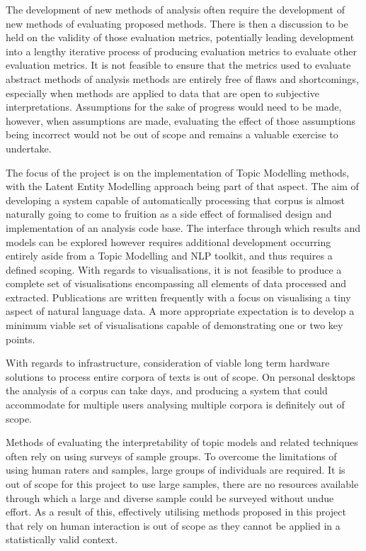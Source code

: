 \documentclass[10pt]{report}
\begin{document}
The development of new methods of analysis often require the development of new methods of evaluating proposed methods. There is then a discussion to be held on the validity of those evaluation metrics, potentially leading development into a lengthy iterative process of producing evaluation metrics to evaluate other evaluation metrics. It is not feasible to ensure that the metrics used to evaluate abstract methods of analysis methods are entirely free of flaws and shortcomings, especially when methods are applied to data that are open to subjective interpretations. Assumptions for the sake of progress would need to be made, however, when assumptions are made, evaluating the effect of those assumptions being incorrect would not be out of scope and remains a valuable exercise to undertake.

The focus of the project is on the implementation of Topic Modelling methods, with the Latent Entity Modelling approach being part of that aspect. The aim of developing a system capable of automatically processing that corpus is almost naturally going to come to fruition as a side effect of formalised design and implementation of an analysis code base. The interface through which results and models can be explored however requires additional development occurring entirely aside from a Topic Modelling and NLP toolkit, and thus requires a defined scoping. With regards to visualisations, it is not feasible to produce a complete set of visualisations encompassing all elements of data processed and extracted. Publications are written frequently with a focus on visualising a tiny aspect of natural language data. A more appropriate expectation is to develop a minimum viable set of visualisations capable of demonstrating one or two key points.

With regards to infrastructure, consideration of viable long term hardware solutions to process entire corpora of texts is out of scope. On personal desktops the analysis of a corpus can take days, and producing a system that could accommodate for multiple users analysing multiple corpora is definitely out of scope.

Methods of evaluating the interpretability of topic models and related techniques often rely on using surveys of sample groups. To overcome the limitations of using human raters and samples, large groups of individuals are required. It is out of scope for this project to use large samples, there are no resources available through which a large and diverse sample could be surveyed without undue effort. As a result of this, effectively utilising methods proposed in this project that rely on human interaction is out of scope as they cannot be applied in a statistically valid context.
\end{document}
